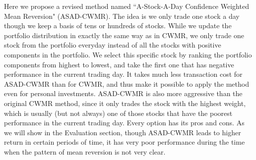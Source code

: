 Here we propose a revised method named ``A-Stock-A-Day Confidence Weighted Mean Reversion" (ASAD-CWMR). The idea is we only trade one stock a day though we keep a basis of tens or hundreds of stocks. While we update the portfolio distribution in exactly the same way as in CWMR, we only trade one stock from the portfolio everyday instead of all the stocks with positive components in the portfolio. We select this specific stock by ranking the portfolio components from highest to lowest, and take the first one that has negative performance in the current trading day. It takes much less transaction cost for ASAD-CWMR than for CWMR, and thus make it possible to apply the method even for personal investments. ASAD-CWMR is also more aggressive than the original CWMR method, since it only trades the stock with the highest weight, which is usually (but not always) one of those stocks that have the poorest performance in the current trading day. Every option has its pros and cons. As we will show in the Evaluation section, though ASAD-CWMR leads to higher return in certain periods of time, it has very poor performance during the time when the pattern of mean reversion is not very clear.
 
